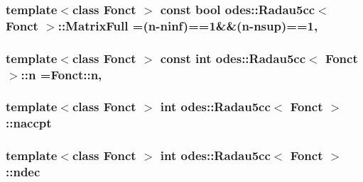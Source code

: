 \subsubsection[{Matrix\+Full}]{\setlength{\rightskip}{0pt plus 5cm}template$<$class Fonct $>$ const bool {\bf odes\+::\+Radau5cc}$<$ Fonct $>$\+::Matrix\+Full =({\bf n}-\/{\bf ninf})==1\&\&({\bf n}-\/{\bf nsup})==1\hspace{0.3cm}{\ttfamily [static]}, {\ttfamily [private]}}\label{classodes_1_1Radau5cc_a8e67471bdbf858fff865561d859a066a}
\hypertarget{classodes_1_1Radau5cc_a3be3f05d2cdf7268e7d09b62ad9ad494}{}
\subsubsection[{n}]{\setlength{\rightskip}{0pt plus 5cm}template$<$class Fonct $>$ const int {\bf odes\+::\+Radau5cc}$<$ Fonct $>$\+::n =Fonct\+::n\hspace{0.3cm}{\ttfamily [static]}, {\ttfamily [private]}}\label{classodes_1_1Radau5cc_a3be3f05d2cdf7268e7d09b62ad9ad494}
\hypertarget{classodes_1_1Radau5cc_a39e641457e737321720c75578189d0db}{}
\subsubsection[{naccpt}]{\setlength{\rightskip}{0pt plus 5cm}template$<$class Fonct $>$ int {\bf odes\+::\+Radau5cc}$<$ Fonct $>$\+::naccpt\hspace{0.3cm}{\ttfamily [private]}}\label{classodes_1_1Radau5cc_a39e641457e737321720c75578189d0db}
\hypertarget{classodes_1_1Radau5cc_af849903adc1f88a3bc6042994bec5621}{}
\subsubsection[{ndec}]{\setlength{\rightskip}{0pt plus 5cm}template$<$class Fonct $>$ int {\bf odes\+::\+Radau5cc}$<$ Fonct $>$\+::ndec\hspace{0.3cm}{\ttfamily [private]}}\label{classodes_1_1Radau5cc_af849903adc1f88a3bc6042994bec5621}
\hypertarget{classodes_1_1Radau5cc_a957de41c2a36e2f254836a6c05dbfb92}{}
